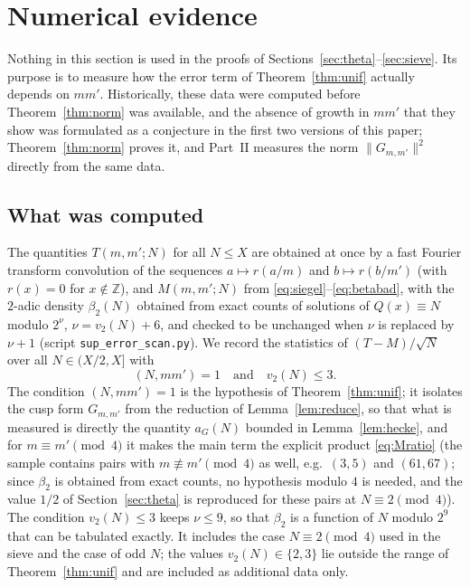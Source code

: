 \documentclass[11pt]{amsart}
\theoremstyle{remark}
\newcommand{\Z}{\mathbb{Z}}
\begin{document}
\section{Numerical evidence}\label{sec:numerics}

Nothing in this section is used in the proofs of Sections~\ref{sec:theta}--\ref{sec:sieve}. Its purpose is to measure how the error term of Theorem~\ref{thm:unif} actually depends on $mm'$. Historically, these data were computed before Theorem~\ref{thm:norm} was available, and the absence of growth in $mm'$ that they show was formulated as a conjecture in the first two versions of this paper; Theorem~\ref{thm:norm} proves it, and Part~II \cite{ChenII} measures the norm $\|G_{m,m'}\|^2$ directly from the same data.

\subsection{What was computed}
The quantities $T(m,m';N)$ for all $N\le X$ are obtained at once by a fast Fourier transform convolution of the sequences $a\mapsto r(a/m)$ and $b\mapsto r(b/m')$ (with $r(x)=0$ for $x\notin\Z$), and $M(m,m';N)$ from \eqref{eq:siegel}--\eqref{eq:betabad}, with the $2$-adic density $\beta_2(N)$ obtained from exact counts of solutions of $Q(x)\equiv N$ modulo $2^{\nu}$, $\nu=v_2(N)+6$, and checked to be unchanged when $\nu$ is replaced by $\nu+1$ (script \texttt{sup\_error\_scan.py}). We record the statistics of $(T-M)/\sqrt N$ over all $N\in(X/2,X]$ with
\begin{equation}\label{eq:admissible}
(N,mm')=1\quad\text{and}\quad v_2(N)\le3 .
\end{equation}
The condition $(N,mm')=1$ is the hypothesis of Theorem~\ref{thm:unif}; it isolates the cusp form $G_{m,m'}$ from the reduction of Lemma~\ref{lem:reduce}, so that what is measured is directly the quantity $a_G(N)$ bounded in Lemma~\ref{lem:hecke}, and for $m\equiv m'\pmod4$ it makes the main term the explicit product \eqref{eq:Mratio} (the sample contains pairs with $m\not\equiv m'\pmod 4$ as well, e.g.\ $(3,5)$ and $(61,67)$; since $\beta_2$ is obtained from exact counts, no hypothesis modulo $4$ is needed, and the value $1/2$ of Section~\ref{sec:theta} is reproduced for these pairs at $N\equiv2\pmod4$). The condition $v_2(N)\le 3$ keeps $\nu\le9$, so that $\beta_2$ is a function of $N$ modulo $2^9$ that can be tabulated exactly. It includes the case $N\equiv2\pmod4$ used in the sieve and the case of odd $N$; the values $v_2(N)\in\{2,3\}$ lie outside the range of Theorem~\ref{thm:unif} and are included as additional data only.
\end{document}
